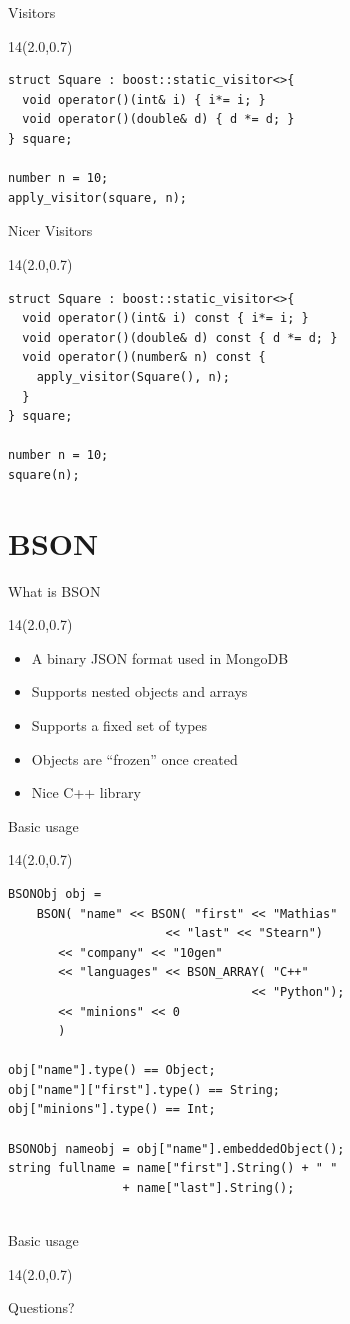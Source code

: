 \documentclass{beamer}
\newcommand{\MongoLogo}{
\begin{textblock}{14}(2.0,0.7)
\end{textblock}
}
\begin{document}
\begin{frame}[fragile] {Visitors}
  \MongoLogo
  \begin{lstlisting}
struct Square : boost::static_visitor<>{
  void operator()(int& i) { i*= i; }
  void operator()(double& d) { d *= d; }
} square;

number n = 10;
apply_visitor(square, n);
  \end{lstlisting}
\end{frame}

\begin{frame}[fragile] {Nicer Visitors}
  \MongoLogo
  \begin{lstlisting}
struct Square : boost::static_visitor<>{
  void operator()(int& i) const { i*= i; }
  void operator()(double& d) const { d *= d; }
  void operator()(number& n) const {
    apply_visitor(Square(), n);
  }
} square;

number n = 10;
square(n);
  \end{lstlisting}
\end{frame}

\section{BSON}
\begin{frame}{What is BSON}
  \MongoLogo
  \begin{itemize}
    \item A binary JSON format used in MongoDB
    \item Supports nested objects and arrays
    \item Supports a fixed set of types
    \item Objects are ``frozen'' once created
    \item Nice C++ library
  \end{itemize}
\end{frame}

\begin{frame}[fragile] {Basic usage}
  \MongoLogo
  \small
  \begin{lstlisting}
BSONObj obj =
    BSON( "name" << BSON( "first" << "Mathias"
                      << "last" << "Stearn")
       << "company" << "10gen"
       << "languages" << BSON_ARRAY( "C++"
                                  << "Python");
       << "minions" << 0
       )

obj["name"].type() == Object;
obj["name"]["first"].type() == String;
obj["minions"].type() == Int;

BSONObj nameobj = obj["name"].embeddedObject();
string fullname = name["first"].String() + " "
                + name["last"].String();
                        
  \end{lstlisting}
\end{frame}

\begin{frame}[fragile] {Basic usage}
  \MongoLogo
  \huge
  Questions?
\end{frame}
\end{document}
